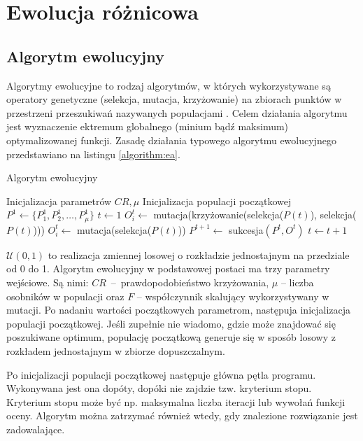 \documentclass[a4paper,onecolumn,oneside,12pt,wide,floatssmall]{mwrep}
\theoremstyle{definition}
\theoremstyle{plain}%
\theoremstyle{remark}
\begin{document}
\chapter{Ewolucja różnicowa}

\section{Algorytm ewolucyjny}

Algorytmy ewolucyjne to rodzaj algorytmów, w których wykorzystywane są operatory genetyczne (selekcja,
mutacja, krzyżowanie) na zbiorach punktów w przestrzeni przeszukiwań nazywanych populacjami \cite{jarabas}. 
Celem działania algorytmu jest
wyznaczenie ektremum globalnego (minium bądź maksimum) optymalizowanej funkcji.
Zasadę działania typowego algorytmu ewolucyjnego przedstawiano na listingu \ref{algorithm:ea}.

\begin{algorithm}[H]
\caption{Algorytm ewolucyjny}
\label{algorithm:ea}
\begin{algorithmic}[1]
\State Inicjalizacja parametrów $CR, \mu$
\State Inicjalizacja populacji początkowej $P^1 \gets \{P^1_1, P^1_2, \ldots, P^1_{\mu}\}$
\State $t \gets 1$
      \State $O^t_i \gets$ mutacja(krzy{\.z}owanie(selekcja($P(t)$), selekcja($P(t)$)))
    \Else
      \State $O^t_i \gets$ mutacja(selekcja($P(t)$))
    \EndIf
  \EndFor
  \State $P^{t+1} \gets$ sukcesja$(P^t, O^t)$
  \State $t \gets t+1$
\EndWhile
\end{algorithmic}
\end{algorithm}

$\mathcal{U}(0, 1)$ to realizacja zmiennej losowej o rozkładzie jednostajnym na przedziale od 0 do 1.
Algorytm ewolucyjny w podstawowej postaci ma trzy parametry wejściowe.
Są nimi: $CR$~--~prawdopodobieństwo krzyżowania, $\mu$ -- liczba osobników w populacji
oraz $F$ -- współczynnik skalujący wykorzystywany w mutacji.
Po nadaniu wartości początkowych parametrom, następuja inicjalizacja populacji początkowej. 
Jeśli zupełnie nie wiadomo, gdzie może znajdować się poszukiwane optimum, 
populację początkową generuje się w sposób losowy z rozkładem jednostajnym w zbiorze dopuszczalnym.

Po inicjalizacji populacji początkowej następuje główna pętla programu. 
Wykonywana jest ona dopóty, dopóki nie zajdzie tzw. kryterium stopu. 
Kryterium stopu może być np. maksymalna liczba iteracji lub wywołań funkcji oceny.
Algorytm można zatrzymać również wtedy, gdy znalezione rozwiązanie jest zadowalające. 
\end{document}
